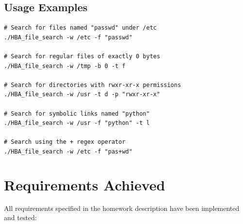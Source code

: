 \documentclass[12pt, a4paper]{article}
\begin{document}
\subsection{Usage Examples}

\begin{lstlisting}[style=bashstyle]
# Search for files named "passwd" under /etc
./HBA_file_search -w /etc -f "passwd"

# Search for regular files of exactly 0 bytes
./HBA_file_search -w /tmp -b 0 -t f

# Search for directories with rwxr-xr-x permissions
./HBA_file_search -w /usr -t d -p "rwxr-xr-x"

# Search for symbolic links named "python"
./HBA_file_search -w /usr -f "python" -t l

# Search using the + regex operator
./HBA_file_search -w /etc -f "pas+wd"
\end{lstlisting}

\section{Requirements Achieved}

All requirements specified in the homework description have been implemented and tested:
\end{document}
